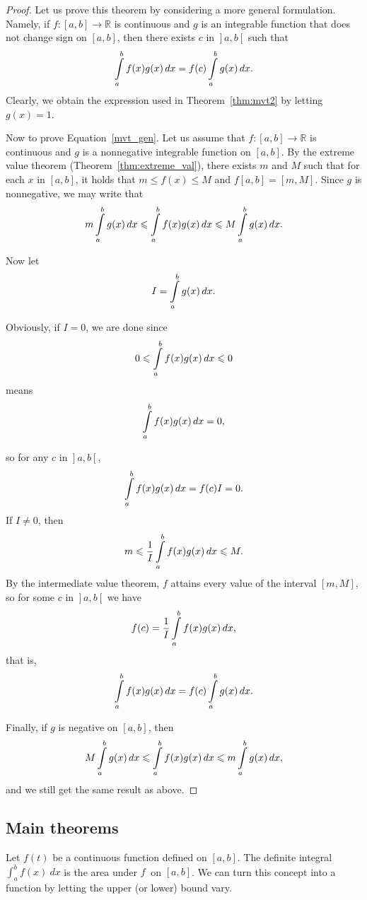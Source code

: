 \ifanalysis

\begin{proof}
Let us prove this theorem by considering a more general formulation. Namely, if  $f : [a, b] \to\mathbb{R}$ is continuous and $g$ is an integrable function that does not change sign on $[a, b]$, then there exists $c$ in $\left.\right]a, b\left[\right.$ such that
\begin{equation}
\displaystyle \int\limits _{a}^{b}f(x)g(x)\,dx=f(c)\displaystyle \int\limits _{a}^{b}g(x)\,dx.
\label{mvt_gen}
\end{equation}
Clearly, we obtain the expression used in Theorem~\ref{thm:mvt2} by letting $g(x)=1$. 

Now to prove Equation~\eqref{mvt_gen}. Let us assume that $f : [a, b] \to\mathbb{R}$ is continuous and $g$ is a nonnegative integrable function on $[a, b]$. By the extreme value theorem (Theorem~\ref{thm:extreme_val}), there exists $m$ and $M$ such that for each $x$ in $[a, b]$, it holds that $m\leq f(x)\leq M $ and $\displaystyle f[a,b]=[m,M]$. Since $g$ is nonnegative, we may write that
$$
\displaystyle m\displaystyle \int\limits _{a}^{b}g(x)\,dx\leqslant \displaystyle \int\limits _{a}^{b}f(x)g(x)\,dx\leqslant M\displaystyle \int\limits _{a}^{b}g(x)\,dx.
$$

Now let
$$
\displaystyle I=\displaystyle \int\limits _{a}^{b}g(x)\,dx.
$$

Obviously, if $I=0$, we are done since
$$
\displaystyle 0\leqslant \displaystyle \int\limits _{a}^{b}f(x)g(x)\,dx\leqslant 0
$$
means
$$
\displaystyle \displaystyle \int\limits _{a}^{b}f(x)g(x)\,dx=0,
$$

so for any $c$ in $\left.\right]a, b\left[\right.$,
$$
\displaystyle \int\limits _{a}^{b}f(x)g(x)\,dx=f(c)I=0.
$$
If $I \neq 0$, then
$$
\displaystyle m\leqslant {\frac {1}{I}}\displaystyle \int\limits _{a}^{b}f(x)g(x)\,dx\leqslant M.
$$
By the intermediate value theorem, $f$ attains every value of the interval $[m, M]$, so for some  $c$ in $\left.\right]a, b\left[\right.$ we have
$$
\displaystyle f(c)={\frac {1}{I}}\displaystyle \int\limits _{a}^{b}f(x)g(x)\,dx,
$$
that is,
$$
\displaystyle \displaystyle \int\limits _{a}^{b}f(x)g(x)\,dx=f(c)\displaystyle \int\limits _{a}^{b}g(x)\,dx.
$$

Finally, if $g$ is negative on $[a, b]$, then
$$
\displaystyle M\displaystyle \int\limits _{a}^{b}g(x)\,dx\leqslant \displaystyle \int\limits _{a}^{b}f(x)g(x)\,dx\leqslant m\displaystyle \int\limits _{a}^{b}g(x)\,dx,
$$
and we still get the same result as above. 
\end{proof}

\fi
\subsection{Main theorems}
Let $f(t)$ be a continuous function defined on $[a,b]$. The definite integral $\int_a^b f(x)\ dx$ is the area under $f\ $ on $[a,b]$. We can turn this concept into a function by letting the upper (or lower) bound vary.


